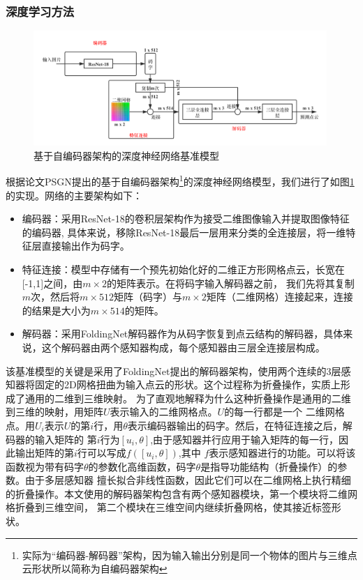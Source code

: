 \documentclass[bachelor, nocolorlinks, printoneside]{seuthesis} %
\begin{document}
\begin{Main}
\subsubsection{深度学习方法}

\begin{figure}
    \centering
    \includegraphics[width=0.99\textwidth]{figs/model/ae_baseline_grid.png} 
    \caption{基于自编码器架构的深度神经网络基准模型}
    \label{fig:ae_baseline}
\end{figure}
根据论文PSGN\cite{fan2017point}提出的基于自编码器架构\footnote[1]{实际为“编码器-解码器”架构，因为输入输出分别是同一个物体的图片与三维点云形状所以简称为自编码器架构}的深度神经网络模型，我们进行了如图\ref{fig:ae_baseline}的实现。网络的主要架构如下：
\begin{itemize}
\item 编码器：采用ResNet-18\cite{He_2016}的卷积层架构作为接受二维图像输入并提取图像特征的编码器, 具体来说，移除ResNet-18最后一层用来分类的全连接层，将一维特征层直接输出作为码字。
\item 特征连接：模型中存储有一个预先初始化好的二维正方形网格点云，长宽在[-1,1]之间，由$m \times 2$的矩阵表示。在将码字输入解码器之前，
我们先将其复制$m$次，然后将$m \times 512$矩阵（码字）与$m \times 2$矩阵（二维网格）连接起来，连接的结果是大小为$m \times 514$的矩阵。
\item 解码器：采用FoldingNet解码器\cite{yang2018foldingnet}作为从码字恢复到点云结构的解码器，具体来说，这个解码器由两个感知器构成，每个感知器由三层全连接层构成。
\end{itemize}

该基准模型的关键是采用了FoldingNet\cite{yang2018foldingnet}提出的解码器架构，使用两个连续的3层感知器将固定的2D网格扭曲为输入点云的形状。这个过程称为折叠操作，实质上形成了通用的二维到三维映射。
为了直观地解释为什么这种折叠操作是通用的二维到三维的映射，用矩阵$U$表示输入的二维网格点。$U$的每一行都是一个
二维网格点。用$U_i$表示$U$的第$i$行，用$\theta$表示编码器输出的码字。然后，在特征连接之后，解码器的输入矩阵的
第$i$行为$[u_i,\theta]$,由于感知器并行应用于输入矩阵的每一行，因此输出矩阵的第$i$行可以写成$f([u_i,\theta])$,其中
$f$表示感知器进行的功能。可以将该函数视为带有码字$\theta$的参数化高维函数，码字$\theta$是指导功能结构（折叠操作）的参数。由于多层感知器
擅长拟合非线性函数，因此它们可以在二维网格上执行精细的折叠操作。本文使用的解码器架构包含有两个感知器模块，第一个模块将二维网格折叠到三维空间，
第二个模块在三维空间内继续折叠网格，使其接近标签形状。


\end{Main}
\end{document}
